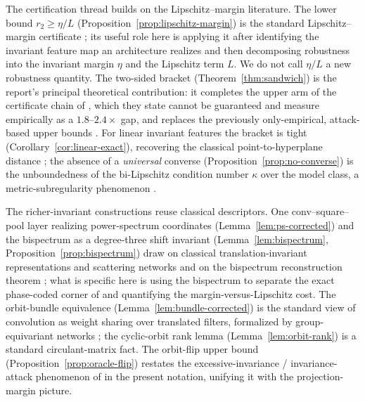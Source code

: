\documentclass[11pt]{article}
\theoremstyle{plain}
\theoremstyle{definition}
\theoremstyle{remark}
\begin{document}
The certification thread builds on the Lipschitz--margin literature.  The lower bound $r_2\ge\eta/L$ (Proposition~\ref{prop:lipschitz-margin}) is the standard Lipschitz--margin certificate \citep{HeinAndriushchenko2017,Tsuzuku2018,Sokolic2016,Bartlett2017}; its useful role here is applying it after identifying the invariant feature map an architecture realizes and then decomposing robustness into the invariant margin $\eta$ and the Lipschitz term $L$.  We do not call $\eta/L$ a new robustness quantity.  The two-sided bracket (Theorem~\ref{thm:sandwich}) is the report's principal theoretical contribution: it completes the upper arm of the certificate chain of \citet[Eq.~5]{Tsuzuku2018}, which they state cannot be guaranteed and measure empirically as a $1.8$--$2.4\times$ gap, and replaces the previously only-empirical, attack-based upper bounds \citep{CroceHeinFAB2020}.  For linear invariant features the bracket is tight (Corollary~\ref{cor:linear-exact}), recovering the classical point-to-hyperplane distance \citep{HeinAndriushchenko2017,CristianiniShaweTaylor2000}; the absence of a \emph{universal} converse (Proposition~\ref{prop:no-converse}) is the unboundedness of the bi-Lipschitz condition number $\kappa$ over the model class, a metric-subregularity phenomenon \citep{DontchevRockafellar2009}.

The richer-invariant constructions reuse classical descriptors.  One conv--square--pool layer realizing power-spectrum coordinates (Lemma~\ref{lem:ps-corrected}) and the bispectrum as a degree-three shift invariant (Lemma~\ref{lem:bispectrum}, Proposition~\ref{prop:bispectrum}) draw on classical translation-invariant representations and scattering networks \citep{BrunaMallat2012} and on the bispectrum reconstruction theorem \citep{Kakarala2012}; what is specific here is using the bispectrum to separate the exact phase-coded corner of \citet{Ge2021} and quantifying the margin-versus-Lipschitz cost.  The orbit-bundle equivalence (Lemma~\ref{lem:bundle-corrected}) is the standard view of convolution as weight sharing over translated filters, formalized by group-equivariant networks \citep{CohenWelling2016}; the cyclic-orbit rank lemma (Lemma~\ref{lem:orbit-rank}) is a standard circulant-matrix fact.  The orbit-flip upper bound (Proposition~\ref{prop:oracle-flip}) restates the excessive-invariance / invariance-attack phenomenon of \citet{Jacobsen2019,Tramer2020} in the present notation, unifying it with the projection-margin picture.
\end{document}
